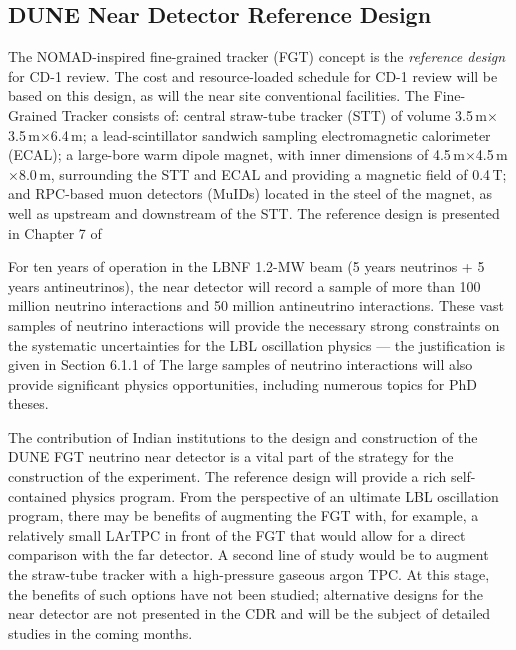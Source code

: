 \subsection{DUNE Near Detector Reference Design }

The NOMAD-inspired fine-grained tracker (FGT) concept is the \textit{reference 
design} for CD-1 review. The cost and resource-loaded schedule for CD-1 review 
will be based on this design, as will the near site conventional facilities. The 
Fine-Grained Tracker consists of:  central straw-tube tracker (STT) of volume 
3.5\,m$\times$3.5\,m$\times$6.4\,m; a lead-scintillator sandwich sampling electromagnetic calorimeter 
(ECAL); a large-bore warm dipole magnet, with inner dimensions of 
4.5\,m$\times$4.5\,m$\times$8.0\,m, surrounding the STT and ECAL and providing a magnetic field of 0.4\,T; 
and RPC-based muon detectors (MuIDs) located in the steel of the magnet, as well 
as upstream and downstream of the STT. The reference 
design is presented in Chapter 
7 of %

For ten years of operation in the LBNF 1.2-MW beam (5 years neutrinos + 5 years 
antineutrinos), the near detector will record a sample of more than 100 million 
neutrino interactions and 50 million antineutrino interactions. These vast samples 
of neutrino interactions will provide the necessary strong constraints on the 
systematic uncertainties for the LBL oscillation physics --- the justification is 
given in Section 6.1.1 of %
The large samples of neutrino 
interactions will also provide significant physics opportunities, including 
numerous topics for PhD theses.  


The contribution of Indian institutions to the design and construction of the DUNE 
FGT neutrino near detector is a vital part of the strategy for the construction 
of the experiment. The reference design will provide a rich self-contained physics 
program. From the perspective of an ultimate LBL oscillation program, there may 
be benefits of augmenting the FGT with, for example, a relatively small LArTPC 
in front of the FGT that would allow for a direct comparison with the far detector. 
A second line of study would be to augment the straw-tube tracker  with 
a high-pressure gaseous argon TPC. At this stage, the benefits of such options 
have not been studied; alternative designs for the near detector are not presented in 
the CDR and will be the subject of detailed studies in the coming months. 

